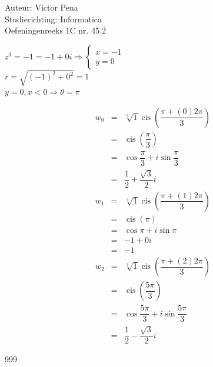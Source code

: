 \documentclass[a4paper]{article}
\DeclareMathOperator{\cis}{cis}
\begin{document}
	
	\noindent \large Auteur: Victor Pena \\
	\noindent \large Studierichting: Informatica\\
	\noindent \large Oefeningenreeks 1C nr. 45.2\\
	
	\medskip
	
	\normalsize 
	$z^3 = -1 = -1 + 0i \Rightarrow
	\left\{
	\begin{array}{l}
		x=-1\\
		y = 0
	\end{array}
	\right .$\\
	
	$r = \sqrt{(-1)^2 + 0^2} = 1$ \\
	
	$y=0, x<0 \Rightarrow \theta = \pi$
	
	\begin{eqnarray*}
		w_0 & = & \sqrt[3]{1}\cis\left(\dfrac{\pi + (0)2\pi}{3}\right) \\
		& = & \cis\left(\dfrac{\pi}{3}\right) \\
		& = & \cos\dfrac{\pi}{3} + i\sin\dfrac{\pi}{3} \\
		& = & \dfrac{1}{2} + \dfrac{\sqrt{3}}{2}i
	\end{eqnarray*}
	\begin{eqnarray*}
		w_1 & = & \sqrt[3]{1}\cis\left(\dfrac{\pi + (1)2\pi}{3}\right) \\
		& = & \cis\left(\pi\right) \\
		& = & \cos\pi + i\sin\pi \\
		& = & -1 + 0i \\
		& = & -1
	\end{eqnarray*}
	\begin{eqnarray*}
		w_2 & = & \sqrt[3]{1}\cis\left(\dfrac{\pi + (2)2\pi}{3}\right) \\
		& = & \cis\left(\dfrac{5\pi}{3}\right) \\
		& = & \cos\dfrac{5\pi}{3} + i\sin\dfrac{5\pi}{3} \\
		& = & \dfrac{1}{2} - \dfrac{\sqrt{3}}{2}i
	\end{eqnarray*}
	
	
	
	
	
	
	\begin{thebibliography}{999}
	\end{thebibliography}
\end{document}
